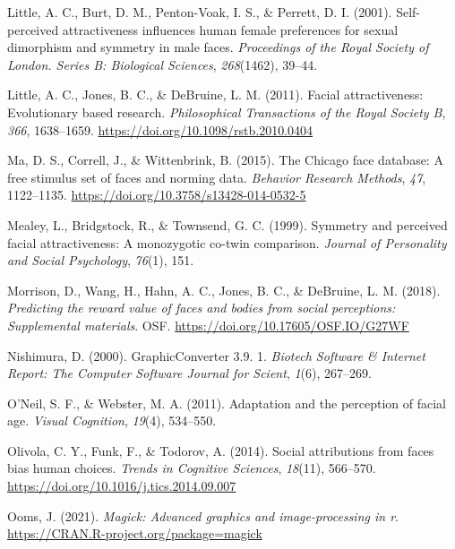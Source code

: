 \documentclass[
  man,floatsintext]{apa6}
\newlength{\cslhangindent}
\newlength{\cslentryspacingunit} %
\newenvironment{CSLReferences}[2] %
 {%
  \setlength{\parindent}{0pt}
  \ifodd #1
  \let\oldpar\par
  \def\par{\hangindent=\cslhangindent\oldpar}
  \fi
  \setlength{\parskip}{#2\cslentryspacingunit}
 }%
 {}
\begin{document}
\begin{CSLReferences}{1}{0}
\leavevmode{}%
Little, A. C., Burt, D. M., Penton-Voak, I. S., \& Perrett, D. I. (2001). Self-perceived attractiveness influences human female preferences for sexual dimorphism and symmetry in male faces. \emph{Proceedings of the Royal Society of London. Series B: Biological Sciences}, \emph{268}(1462), 39--44.

\leavevmode{}%
Little, A. C., Jones, B. C., \& DeBruine, L. M. (2011). Facial attractiveness: Evolutionary based research. \emph{Philosophical Transactions of the Royal Society B}, \emph{366}, 1638--1659. \url{https://doi.org/10.1098/rstb.2010.0404}

\leavevmode{}%
Ma, D. S., Correll, J., \& Wittenbrink, B. (2015). The {Chicago} face database: A free stimulus set of faces and norming data. \emph{Behavior Research Methods}, \emph{47}, 1122--1135. \url{https://doi.org/10.3758/s13428-014-0532-5}

\leavevmode{}%
Mealey, L., Bridgstock, R., \& Townsend, G. C. (1999). Symmetry and perceived facial attractiveness: A monozygotic co-twin comparison. \emph{Journal of Personality and Social Psychology}, \emph{76}(1), 151.

\leavevmode{}%
Morrison, D., Wang, H., Hahn, A. C., Jones, B. C., \& DeBruine, L. M. (2018). \emph{Predicting the reward value of faces and bodies from social perceptions: Supplemental materials}. OSF. \url{https://doi.org/10.17605/OSF.IO/G27WF}

\leavevmode{}%
Nishimura, D. (2000). GraphicConverter 3.9. 1. \emph{Biotech Software \& Internet Report: The Computer Software Journal for Scient}, \emph{1}(6), 267--269.

\leavevmode{}%
O'Neil, S. F., \& Webster, M. A. (2011). Adaptation and the perception of facial age. \emph{Visual Cognition}, \emph{19}(4), 534--550.

\leavevmode{}%
Olivola, C. Y., Funk, F., \& Todorov, A. (2014). Social attributions from faces bias human choices. \emph{Trends in Cognitive Sciences}, \emph{18}(11), 566--570. \url{https://doi.org/10.1016/j.tics.2014.09.007}

\leavevmode{}%
Ooms, J. (2021). \emph{Magick: Advanced graphics and image-processing in r}. \url{https://CRAN.R-project.org/package=magick}


\end{CSLReferences}
\end{document}
